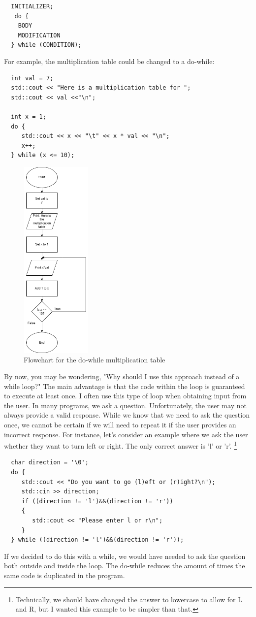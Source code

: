 \begin{verbatim}
  INITIALIZER;
   do {
    BODY
    MODIFICATION
  } while (CONDITION);
\end{verbatim}
%

For example, the multiplication table could be changed to a do-while:
\begin{lstlisting}
  int val = 7;
  std::cout << "Here is a multiplication table for ";
  std::cout << val <<"\n";
  
  int x = 1;
  do {
     std::cout << x << "\t" << x * val << "\n";
     x++;
  } while (x <= 10);
\end{lstlisting}
\begin{figure}[h]
    \centering
    \includegraphics[height=10cm]{images/do-whileflow.png}
    \caption{Flowchart for the do-while multiplication table}
    \label{fig:do-while}
\end{figure}
By now, you may be wondering, "Why should I use this approach instead of a while loop?" The main advantage is that the code within the loop is guaranteed to execute at least once. I often use this type of loop when obtaining input from the user. In many programs, we ask a question. Unfortunately, the user may not always provide a valid response. While we know that we need to ask the question once, we cannot be certain if we will need to repeat it if the user provides an incorrect response. For instance, let's consider an example where we ask the user whether they want to turn left or right. The only correct answer is 'l' or 'r'. \footnote{Technically, we should have changed the answer to lowercase to allow for L and R,
but I wanted this example to be simpler than that.}
\begin{lstlisting}
  char direction = '\0';
  do {
     std::cout << "Do you want to go (l)eft or (r)ight?\n");
     std::cin >> direction;
     if ((direction != 'l')&&(direction != 'r'))
     {
        std::cout << "Please enter l or r\n";
     }
  } while ((direction != 'l')&&(direction != 'r'));
\end{lstlisting}
If we decided to do this with a while, we would have needed to ask 
the question both outside and inside the loop. The do-while reduces the amount of times the same code is duplicated in the program.

